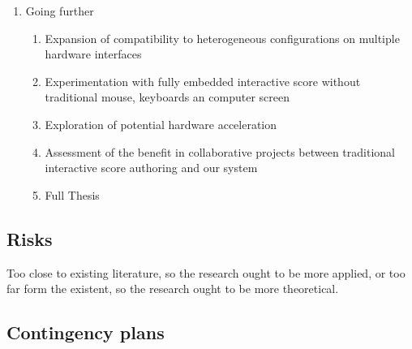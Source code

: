 \documentclass[journal,onecolumn]{IEEEtran}
\begin{document}
\begin{enumerate}
\begin{enumerate}
        \item Evaluation of necessary textual feedback (data can only be communicated to the user through text)
        \item Exploration of preformative substitute to menus (and dreaded "menu diving")
        \item Experimentation of more unusual uses of hardware interfaces (like the patching environment of the Empress Zoya\footnote{Official web page: empresseffects.com/products/zoia})
        \item Publication of the thesis's forth chapter, accompanying an official release of the system considered "production ready".
    \end{enumerate}
    \item Going further
    \begin{enumerate}
        \item Expansion of compatibility to heterogeneous configurations on multiple hardware interfaces
        \item Experimentation with fully embedded interactive score without traditional mouse, keyboards an computer screen
        \item Exploration of potential hardware acceleration
        \item Assessment of the benefit in collaborative projects between traditional interactive score authoring and our system
        \item Full Thesis
    \end{enumerate}
\end{enumerate}

\subsection{Risks}
Too close to existing literature, so the research ought to be more applied, or too far form the existent, so the research ought to be more theoretical.
\subsection{Contingency plans}
\end{document}
